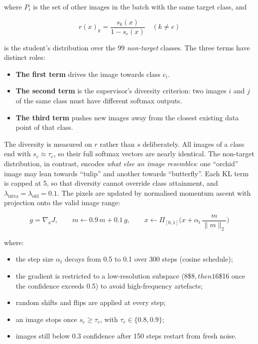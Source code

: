 \documentclass[
  10pt,
]{article}
\providecommand{\tightlist}{%
  \setlength{\itemsep}{0pt}\setlength{\parskip}{0pt}}
\begin{document}
where \(P_i\) is the set of other images in the batch with the same
target class, and

\begin{equation}r(x)_k=\frac{s_k(x)}{1-s_{c}(x)}\quad (k\neq c)\label{eq:6}\end{equation}

is the student's distribution over the 99 \emph{non-target} classes. The
three terms have distinct roles:

\begin{itemize}
\tightlist
\item
  \textbf{The first term} drives the image towards class \(c_i\).
\item
  \textbf{The second term} is the supervisor's diversity criterion: two
  images \(i\) and \(j\) of the same class must have different softmax
  outputs.
\item
  \textbf{The third term} pushes new images away from the closest
  existing data point of that class.
\end{itemize}

The diversity is measured on \(r\) rather than \(s\) deliberately. All
images of a class end with \(s_c\approx\tau_c\), so their full softmax
vectors are nearly identical. The non-target distribution, in contrast,
encodes \emph{what else an image resembles}: one ``orchid'' image may
lean towards ``tulip'' and another towards ``butterfly''. Each KL term
is capped at 5, so that diversity cannot override class attainment, and
\(\lambda_{\text{intra}}=\lambda_{\text{old}}=0.1\). The pixels are
updated by normalised momentum ascent with projection onto the valid
image range:

\begin{equation}g=\nabla_x J,\qquad m\leftarrow 0.9\,m+0.1\,g,\qquad x\leftarrow\Pi_{[0,1]}\Big(x+\alpha_t\,\frac{m}{\|m\|_2}\Big)\label{eq:7}\end{equation}

where:

\begin{itemize}
\tightlist
\item
  the step size \(\alpha_t\) decays from 0.5 to 0.1 over 300 steps
  (cosine schedule);
\item
  the gradient is restricted to a low-resolution subspace
  (8\$\times\(8, then 16\)\times\$16 once the confidence exceeds 0.5) to
  avoid high-frequency artefacts;
\item
  random shifts and flips are applied at every step;
\item
  an image stops once \(s_c\ge\tau_c\), with \(\tau_c\in\{0.8,0.9\}\);
\item
  images still below 0.3 confidence after 150 steps restart from fresh
  noise.
\end{itemize}
\end{document}
